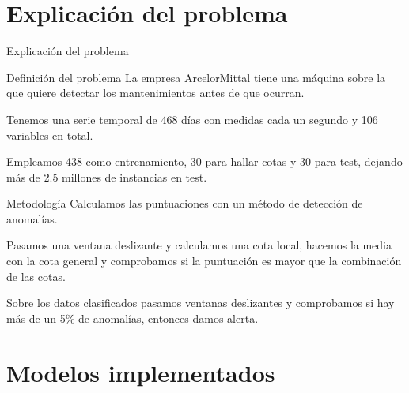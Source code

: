 \documentclass[10pt]{beamer}
\begin{document}
\section{Explicación del problema}

\begin{frame}[fragile]{Explicación del problema}
	\vspace{5px}
	\pause
	
	\begin{block}{Definición del problema}
		La empresa ArcelorMittal tiene una máquina sobre la que quiere detectar los mantenimientos antes de que ocurran.
		
		Tenemos una serie temporal de 468 días con medidas cada un segundo y 106 variables en total.
		
		Empleamos 438 como entrenamiento, 30 para hallar cotas y 30 para test, dejando más de 2.5 millones de instancias en test.
	\end{block}

	\pause

	\begin{exampleblock}{Metodología}
		Calculamos las puntuaciones con un método de detección de anomalías.
		
		\pause
		
		Pasamos una ventana deslizante y calculamos una cota local, hacemos la media con la cota general y comprobamos si la puntuación es mayor que la combinación de las cotas.
		
		\pause
		
		Sobre los datos clasificados pasamos ventanas deslizantes y comprobamos si hay más de un 5\% de anomalías, entonces damos alerta.
	\end{exampleblock}
	
\end{frame}

\section{Modelos implementados}
\end{document}
